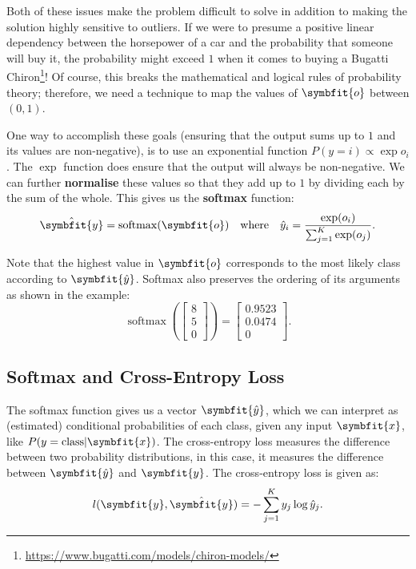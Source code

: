 Both of these issues make the problem difficult to solve in addition to making the solution highly sensitive to outliers. If we were to presume a positive linear dependency between the horsepower of a car and the probability that someone will buy it, the probability might exceed $1$ when it comes to buying a Bugatti Chiron\footnote{\url{https://www.bugatti.com/models/chiron-models/}}! Of course, this breaks the mathematical and logical rules of probability theory; therefore, we need a technique to map the values of $\symbfit{o}$ between $(0, 1)$.

One way to accomplish these goals (ensuring that the output sums up to $1$ and its values are non-negative), is to use an exponential function $P(y = i) \propto \exp o_i$. The $\exp$ function does ensure that the output will always be non-negative. We can further \textbf{normalise} these values so that they add up to $1$ by dividing each by the sum of the whole. This gives us the \textbf{softmax} function:
\begin{equation}
    \hat{\symbfit{y}} = \operatorname{softmax}(\symbfit{o}) \quad \text{where}\quad \hat{y}_i = \frac{\exp(o_i)}{\sum_{j=1}^{K} \exp(o_j)}.
\end{equation}

Note that the highest value in $\symbfit{o}$ corresponds to the most likely class according to $\symbfit{\hat{y}}$. Softmax also preserves the ordering of its arguments as shown in the example:
\begin{equation}
    \nonumber
    \operatorname{softmax} \left(\begin{bmatrix}
    8\\
    5\\
    0
    \end{bmatrix}\right)
    = 
    \begin{bmatrix}
    0.9523\\
    0.0474\\
    0
    \end{bmatrix}.
\end{equation}

\subsection{Softmax and Cross-Entropy Loss}\label{ssec:ce-loss}

The softmax function gives us a vector $\symbfit{\hat{y}}$, which we can interpret as (estimated) conditional probabilities of each class, given any input $\symbfit{x}$, like $P(y=\text{class} | \symbfit{x})$. 
The cross-entropy loss measures the difference between two probability distributions, in this case, it measures the difference between $\symbfit{\hat{y}}$ and $\symbfit{y}$. The cross-entropy loss is given as:
\begin{equation}\label{eqn:ce-loss}
    l(\symbfit{y}, \hat{\symbfit{y}}) = - \sum_{j=1}^K y_j \log \hat{y}_j.
\end{equation}

